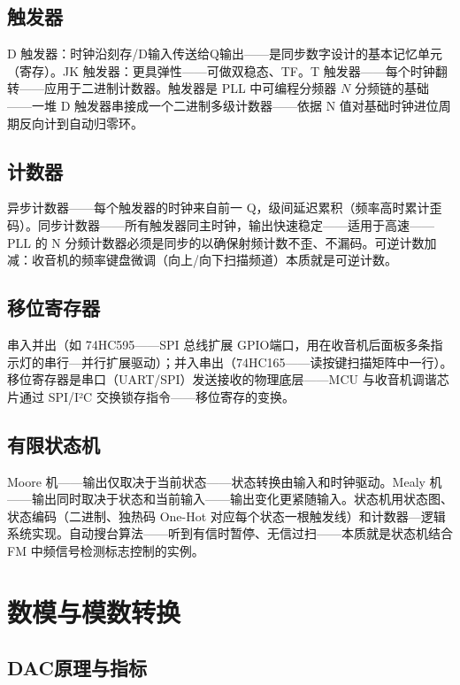 \documentclass[12pt,UTF8]{ctexbook}
\begin{document}
\subsection{触发器}

D 触发器：时钟沿刻存/D输入传送给Q输出——是同步数字设计的基本记忆单元（寄存）。JK 触发器：更具弹性——可做双稳态、TF。T 触发器——每个时钟翻转——应用于二进制计数器。触发器是 PLL 中可编程分频器 $N$ 分频链的基础——一堆 D 触发器串接成一个二进制多级计数器——依据 N 值对基础时钟进位周期反向计到自动归零环。

\subsection{计数器}

异步计数器——每个触发器的时钟来自前一 Q，级间延迟累积（频率高时累计歪码）。同步计数器——所有触发器同主时钟，输出快速稳定——适用于高速——PLL 的 N 分频计数器必须是同步的以确保射频计数不歪、不漏码。可逆计数加减：收音机的频率键盘微调（向上/向下扫描频道）本质就是可逆计数。

\subsection{移位寄存器}

串入并出（如 74HC595——SPI 总线扩展 GPIO端口，用在收音机后面板多条指示灯的串行—并行扩展驱动）；并入串出（74HC165——读按键扫描矩阵中一行）。移位寄存器是串口（UART/SPI）发送接收的物理底层——MCU 与收音机调谐芯片通过 SPI/I²C 交换锁存指令——移位寄存的变换。

\subsection{有限状态机}

Moore 机——输出仅取决于当前状态——状态转换由输入和时钟驱动。Mealy 机——输出同时取决于状态和当前输入——输出变化更紧随输入。状态机用状态图、状态编码（二进制、独热码 One-Hot 对应每个状态一根触发线）和计数器—逻辑系统实现。自动搜台算法——听到有信时暂停、无信过扫——本质就是状态机结合 FM 中频信号检测标志控制的实例。

\section{数模与模数转换}
\label{sec:dac_adc}

\subsection{DAC原理与指标}
\end{document}
